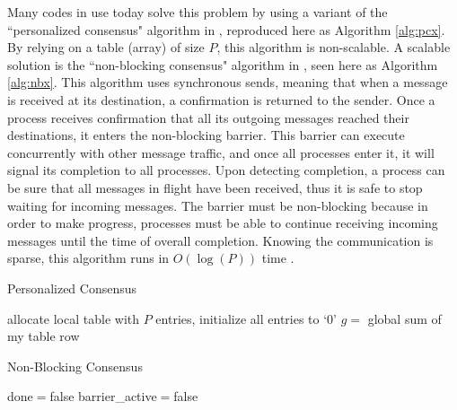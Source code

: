 Many codes in use today solve this problem by using a variant
of the ``personalized consensus" algorithm in \cite{hoefler2010scalable},
reproduced here as Algorithm \ref{alg:pcx}.
By relying on a table (array) of size $P$, this algorithm is
non-scalable.
A scalable solution is the ``non-blocking consensus" algorithm
in \cite{hoefler2010scalable}, seen here as Algorithm \ref{alg:nbx}.
This algorithm uses synchronous sends, meaning that when a message
is received at its destination, a confirmation is returned to the
sender.
Once a process receives confirmation that all its outgoing messages
reached their destinations, it enters the non-blocking barrier.
This barrier can execute concurrently with other message traffic,
and once all processes enter it, it will signal its completion
to all processes.
Upon detecting completion, a process can be sure that all messages
in flight have been received, thus it is safe to stop waiting for
incoming messages.
The barrier must be non-blocking because in order to make progress,
processes must be able to continue receiving incoming messages
until the time of overall completion.
Knowing the communication is sparse, this algorithm runs in $O(\log(P))$
time \cite{hoefler2010scalable}.

\begin{algorithm}
\caption{Personalized Consensus \cite{hoefler2010scalable}}
\label{alg:pcx}
allocate local table with $P$ entries, initialize all entries to `0'\;
$g=$ global sum of my table row\;
\end{algorithm}

\begin{algorithm}
\caption{Non-Blocking Consensus \cite{hoefler2010scalable}}
\label{alg:nbx}
done$=$false\;
barrier\_active$=$false\;
\end{algorithm}

